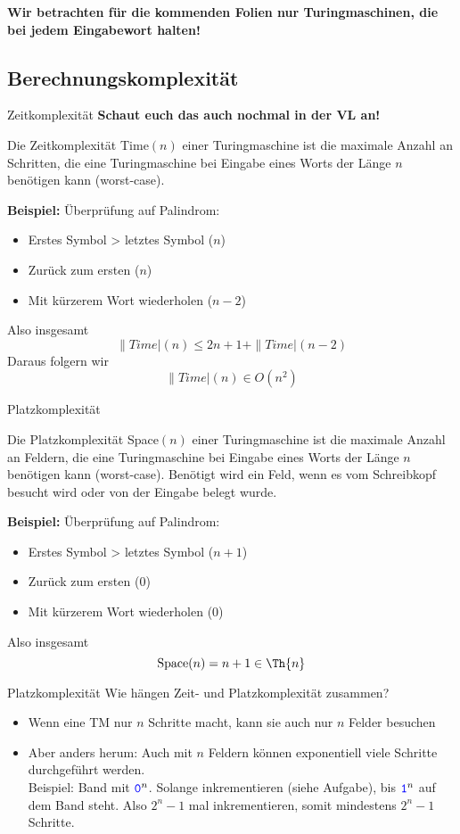 \begin{frame}[plain] \large \bf \centering
	Wir betrachten für die kommenden Folien nur Turingmaschinen, die bei jedem Eingabewort halten!
\end{frame}

\subsection{Berechnungskomplexität}
\begin{frame}{Zeitkomplexität}
	\textbf{Schaut euch das auch nochmal in der VL an!}
	\begin{Definition}
		Die Zeitkomplexität Time$(n)$ einer Turingmaschine ist die maximale Anzahl an Schritten, die eine Turingmaschine bei Eingabe eines Worts der Länge $n$ benötigen kann (worst-case).
	\end{Definition}
	\pause
	\textbf{Beispiel:} Überprüfung auf Palindrom:
	\begin{itemize}[<+->]
		\item Erstes Symbol \?> letztes Symbol ($n$) 
		\item Zurück zum ersten ($n$)
		\item Mit kürzerem Wort wiederholen ($n-2$)
	\end{itemize} \pause
	Also insgesamt $$\|Time|(n) \leq 2n + 1 + \|Time|(n-2)$$ 
	Daraus folgern wir $$\|Time|(n) \in O(n^2)$$
\end{frame}

\begin{frame}{Platzkomplexität}
	\begin{Definition}
		Die Platzkomplexität Space$(n)$ einer Turingmaschine ist die maximale Anzahl an Feldern, die eine Turingmaschine bei Eingabe eines Worts der Länge $n$ benötigen kann (worst-case). Benötigt wird ein Feld, wenn es vom Schreibkopf besucht wird oder von der Eingabe belegt wurde.
	\end{Definition}
	\pause
	\textbf{Beispiel:} Überprüfung auf Palindrom:
	\begin{itemize}[<+->]
		\item Erstes Symbol \?> letztes Symbol ($n + 1$) 
		\item Zurück zum ersten ($0$)
		\item Mit kürzerem Wort wiederholen ($0$)
	\end{itemize} \pause
	Also insgesamt $$\|Space|(n) = n+1 \in \Th{n}$$
\end{frame}

\begin{frame}{Platzkomplexität}
	Wie hängen Zeit- und Platzkomplexität zusammen?
	\begin{itemize}
		\item Wenn eine TM nur $n$ Schritte macht, kann sie auch nur $n$ Felder besuchen
		\item Aber anders herum: Auch mit $n$ Feldern können exponentiell viele Schritte durchgeführt werden.\\
			  Beispiel: Band mit $\hbox{\textcolor{blue}{\texttt{0}}}^n$. Solange inkrementieren (siehe Aufgabe), bis $\hbox{\textcolor{blue}{\texttt{1}}}^n$ auf dem Band steht. \pause Also $2^n - 1$ mal inkrementieren, somit mindestens $2^n - 1$ Schritte.
	\end{itemize}
\end{frame}

